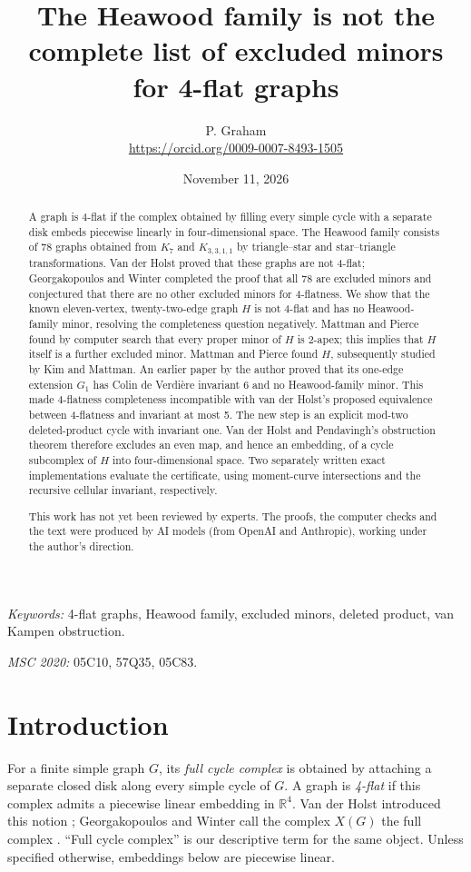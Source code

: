 \documentclass[11pt]{article}
\title{The Heawood family is not the complete list of excluded minors for 4-flat graphs}
\author{P. Graham\\ \small\url{https://orcid.org/0009-0007-8493-1505}}
\date{November 11, 2026}
\newcommand{\R}{\mathbb R}
\begin{document}
\maketitle
\begin{abstract}
A graph is 4-flat if the complex obtained by filling every simple cycle
with a separate disk embeds piecewise linearly in four-dimensional space.
The Heawood family consists of 78 graphs obtained from $K_7$ and
$K_{3,3,1,1}$ by triangle--star and star--triangle transformations.
Van der Holst proved that these graphs are not 4-flat; Georgakopoulos
and Winter completed the proof that all 78 are excluded minors and
conjectured that there are no other excluded minors for 4-flatness.
We show that the known eleven-vertex, twenty-two-edge graph $H$ is not
4-flat and has no Heawood-family minor, resolving the completeness
question negatively. Mattman and Pierce found by computer search that
every proper minor of $H$ is 2-apex; this implies that $H$ itself is a
further excluded minor.
Mattman and Pierce found $H$, subsequently studied by Kim and Mattman.
An earlier paper by the author proved that its one-edge extension $G_1$
has Colin de Verdi\`ere invariant 6 and no Heawood-family minor. This made
4-flatness completeness incompatible with van der Holst's proposed
equivalence between 4-flatness and invariant at most 5.
The new step is an explicit mod-two deleted-product cycle with invariant
one. Van der Holst and Pendavingh's obstruction theorem therefore excludes
an even map, and hence an embedding, of a cycle subcomplex of $H$ into
four-dimensional space. Two separately written exact implementations
evaluate the certificate, using moment-curve intersections and the
recursive cellular invariant, respectively.

This work has not yet been reviewed by experts.
The proofs, the computer checks and the text were produced by AI models
(from OpenAI and Anthropic), working under the author's direction.
\end{abstract}
\medskip
\noindent\textit{Keywords:} 4-flat graphs, Heawood family, excluded minors,
deleted product, van Kampen obstruction.

\noindent\textit{MSC 2020:} 05C10, 57Q35, 05C83.

\section{Introduction}
For a finite simple graph $G$, its \emph{full cycle complex} is obtained
by attaching a separate closed disk along every simple cycle of $G$.
A graph is \emph{4-flat} if this complex admits a piecewise linear
embedding in $\R^4$. Van der Holst introduced this notion \cite{vdH};
Georgakopoulos and Winter call the complex $X(G)$ the full complex
\cite[Definition 2.3]{GW}. ``Full cycle complex'' is our descriptive term
for the same object. Unless specified otherwise, embeddings below are
piecewise linear.
\end{document}
